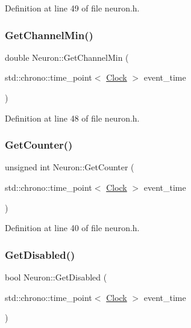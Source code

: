 Definition at line 49 of file neuron.\+h.

\mbox{\label{class_neuron_a794c8fa270ea0600dab4fd13c25912fd}} 
\subsubsection{\texorpdfstring{Get\+Channel\+Min()}{GetChannelMin()}}
{\footnotesize\ttfamily double Neuron\+::\+Get\+Channel\+Min (\begin{DoxyParamCaption}\item[{std\+::chrono\+::time\+\_\+point$<$ \hyperlink{universe_8h_a0ef8d951d1ca5ab3cfaf7ab4c7a6fd80}{Clock} $>$}]{event\+\_\+time }\end{DoxyParamCaption})\hspace{0.3cm}{\ttfamily [inline]}}



Definition at line 48 of file neuron.\+h.

\mbox{\label{class_neuron_a0b5fe55bf939808986b3697d18a834f4}} 
\subsubsection{\texorpdfstring{Get\+Counter()}{GetCounter()}}
{\footnotesize\ttfamily unsigned int Neuron\+::\+Get\+Counter (\begin{DoxyParamCaption}\item[{std\+::chrono\+::time\+\_\+point$<$ \hyperlink{universe_8h_a0ef8d951d1ca5ab3cfaf7ab4c7a6fd80}{Clock} $>$}]{event\+\_\+time }\end{DoxyParamCaption})\hspace{0.3cm}{\ttfamily [inline]}}



Definition at line 40 of file neuron.\+h.

\mbox{\label{class_neuron_adfee1a62df820344b84fe2020451b24f}} 
\subsubsection{\texorpdfstring{Get\+Disabled()}{GetDisabled()}}
{\footnotesize\ttfamily bool Neuron\+::\+Get\+Disabled (\begin{DoxyParamCaption}\item[{std\+::chrono\+::time\+\_\+point$<$ \hyperlink{universe_8h_a0ef8d951d1ca5ab3cfaf7ab4c7a6fd80}{Clock} $>$}]{event\+\_\+time }\end{DoxyParamCaption})\hspace{0.3cm}{\ttfamily [inline]}}



